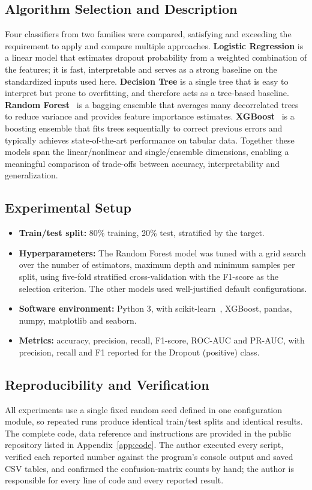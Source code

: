 \documentclass[conference]{IEEEtran}
\begin{document}
	\subsection{Algorithm Selection and Description}
	Four classifiers from two families were compared, satisfying and exceeding the requirement to apply and compare multiple approaches. \textbf{Logistic Regression} is a linear model that estimates dropout probability from a weighted combination of the features; it is fast, interpretable and serves as a strong baseline on the standardized inputs used here. \textbf{Decision Tree} is a single tree that is easy to interpret but prone to overfitting, and therefore acts as a tree-based baseline. \textbf{Random Forest}~\cite{b4} is a bagging ensemble that averages many decorrelated trees to reduce variance and provides feature importance estimates. \textbf{XGBoost}~\cite{b5} is a boosting ensemble that fits trees sequentially to correct previous errors and typically achieves state-of-the-art performance on tabular data. Together these models span the linear/nonlinear and single/ensemble dimensions, enabling a meaningful comparison of trade-offs between accuracy, interpretability and generalization.
	
	\subsection{Experimental Setup}
	\begin{itemize}
		\item \textbf{Train/test split:} 80\% training, 20\% test, stratified by the target.
		\item \textbf{Hyperparameters:} The Random Forest model was tuned with a grid search over the number of estimators, maximum depth and minimum samples per split, using five-fold stratified cross-validation with the F1-score as the selection criterion. The other models used well-justified default configurations.
		\item \textbf{Software environment:} Python 3, with scikit-learn~\cite{b6}, XGBoost, pandas, numpy, matplotlib and seaborn.
		\item \textbf{Metrics:} accuracy, precision, recall, F1-score, ROC-AUC and PR-AUC, with precision, recall and F1 reported for the Dropout (positive) class.
	\end{itemize}
	
	\subsection{Reproducibility and Verification}
	All experiments use a single fixed random seed defined in one configuration module, so repeated runs produce identical train/test splits and identical results. The complete code, data reference and instructions are provided in the public repository listed in Appendix~\ref{app:code}. The author executed every script, verified each reported number against the program's console output and saved CSV tables, and confirmed the confusion-matrix counts by hand; the author is responsible for every line of code and every reported result.
	
\end{document}
